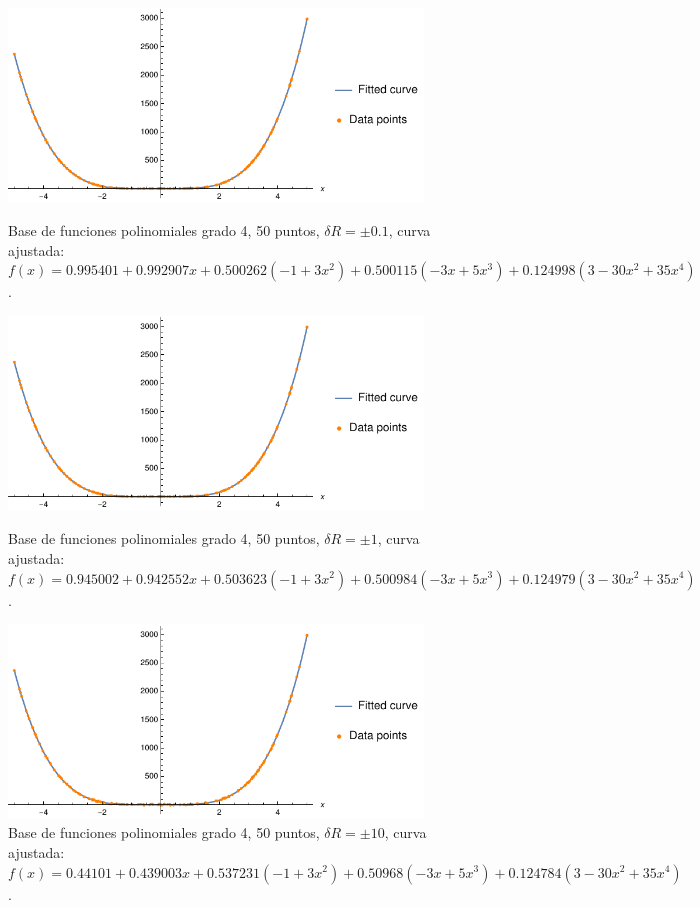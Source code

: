 \documentclass[11pt,letterpaper]{article}
\begin{document}
\begin{figure}
\centering
\includegraphics[width=11cm]{legendre_07}
\caption{Base de funciones polinomiales grado 4, 50 puntos, $\delta R=\pm 0.1$,
curva ajustada: $f(x)=0.995401 + 0.992907 x + 0.500262 (-1 + 3 x^2) + 
 0.500115 (-3 x + 5 x^3) + 0.124998 (3 - 30 x^2 + 35 x^4)$.}
\includegraphics[width=11cm]{legendre_08}
\caption{Base de funciones polinomiales grado 4, 50 puntos, $\delta R=\pm 1$,
curva ajustada: $f(x)=0.945002 + 0.942552 x + 0.503623 (-1 + 3 x^2) + 
 0.500984 (-3 x + 5 x^3) + 0.124979 (3 - 30 x^2 + 35 x^4)$.}
\includegraphics[width=11cm]{legendre_09}
\caption{Base de funciones polinomiales grado 4, 50 puntos, $\delta R=\pm 10$,
curva ajustada: $f(x)=0.44101 + 0.439003 x + 0.537231 (-1 + 3 x^2) + 
 0.50968 (-3 x + 5 x^3) + 0.124784 (3 - 30 x^2 + 35 x^4)$.}
\label{fig:poly_50pts}
\end{figure}
\end{document}
